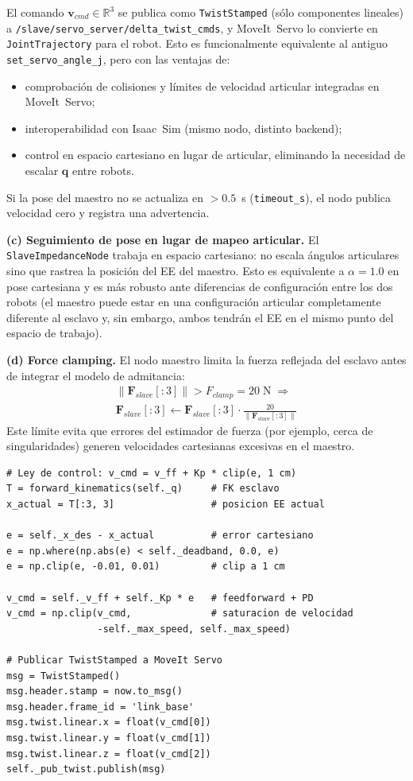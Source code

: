 \documentclass[journal,10pt,twoside]{IEEEtran}
\begin{document}
El comando $\bm{v}_{cmd} \in \mathbb{R}^3$ se publica como
\texttt{TwistStamped} (sólo componentes lineales) a
\texttt{/slave/servo\_server/delta\_twist\_cmds},
y MoveIt~Servo lo convierte en \texttt{JointTrajectory} para el robot.
Esto es funcionalmente equivalente al antiguo
\texttt{set\_servo\_angle\_j}, pero con las ventajas de:
\begin{itemize}
  \item comprobación de colisiones y límites de velocidad articular
        integradas en MoveIt~Servo;
  \item interoperabilidad con Isaac~Sim (mismo nodo, distinto backend);
  \item control en espacio cartesiano en lugar de articular, eliminando
        la necesidad de escalar $\bm{q}$ entre robots.
\end{itemize}
Si la pose del maestro no se actualiza en $>0.5$~s (\texttt{timeout\_s}),
el nodo publica velocidad cero y registra una advertencia.


\textbf{(c) Seguimiento de pose en lugar de mapeo articular.}
El \texttt{SlaveImpedanceNode} trabaja en espacio cartesiano:
no escala ángulos articulares sino que rastrea la posición del EE
del maestro. Esto es equivalente a $\alpha = 1.0$ en pose cartesiana
y es más robusto ante diferencias de configuración entre los dos robots
(el maestro puede estar en una configuración articular completamente
diferente al esclavo y, sin embargo, ambos tendrán el EE en el mismo
punto del espacio de trabajo).

\textbf{(d) Force clamping.}
El nodo maestro limita la fuerza reflejada del esclavo antes de
integrar el modelo de admitancia:
\begin{multline*}
  \|\bm{F}_{slave}[:3]\| > F_{clamp} = 20\;\text{N}
  \;\Rightarrow \\
  \bm{F}_{slave}[:3] \leftarrow
  \bm{F}_{slave}[:3] \cdot \frac{20}{\|\bm{F}_{slave}[:3]\|}
\end{multline*}
Este límite evita que errores del estimador de fuerza (por ejemplo,
cerca de singularidades) generen velocidades cartesianas excesivas
en el maestro.

\begin{lstlisting}[caption={Control del esclavo — SlaveImpedanceNode (slave\_node.py)},
                   label={lst:slave}]
# Ley de control: v_cmd = v_ff + Kp * clip(e, 1 cm)
T = forward_kinematics(self._q)     # FK esclavo
x_actual = T[:3, 3]                 # posicion EE actual

e = self._x_des - x_actual          # error cartesiano
e = np.where(np.abs(e) < self._deadband, 0.0, e)
e = np.clip(e, -0.01, 0.01)         # clip a 1 cm

v_cmd = self._v_ff + self._Kp * e   # feedforward + PD
v_cmd = np.clip(v_cmd,              # saturacion de velocidad
                -self._max_speed, self._max_speed)

# Publicar TwistStamped a MoveIt Servo
msg = TwistStamped()
msg.header.stamp = now.to_msg()
msg.header.frame_id = 'link_base'
msg.twist.linear.x = float(v_cmd[0])
msg.twist.linear.y = float(v_cmd[1])
msg.twist.linear.z = float(v_cmd[2])
self._pub_twist.publish(msg)
\end{lstlisting}
\end{document}
